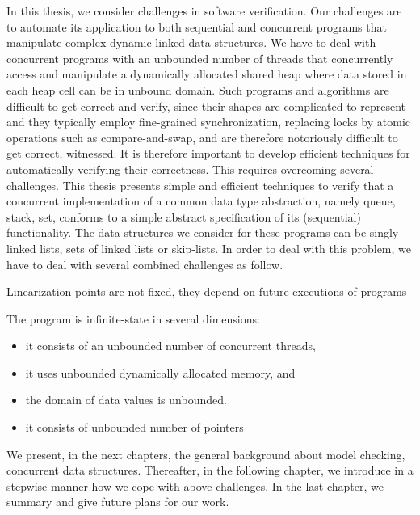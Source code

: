 In this thesis, we consider challenges in software verification. Our challenges are to automate its application to both sequential and concurrent programs that manipulate complex dynamic linked data structures. We have to deal with concurrent programs with an unbounded number of threads that concurrently access and manipulate a dynamically allocated shared heap where data stored in each heap cell can be in unbound domain. Such programs and algorithms are difficult to get correct and verify, since their shapes are complicated to represent and they typically employ fine-grained synchronization, replacing locks by atomic operations such as compare-and-swap, and are therefore notoriously difficult to get correct, witnessed. It is therefore important to develop efficient techniques for automatically verifying their correctness. This requires overcoming several challenges. This thesis presents simple and efficient techniques to verify that a concurrent implementation of a common data type abstraction, namely queue, stack, set, conforms to a simple abstract specification of its (sequential) functionality. The data structures we consider for these programs can be singly-linked lists, sets of linked lists or skip-lists. In order to deal with this problem, we have to deal with several combined challenges as follow.
\newpage
\begin{challenges}
\item Linearization points are not fixed, they depend on future executions of programs
\item The program is infinite-state in several dimensions:
\begin{itemize}
\item it consists of an unbounded number of concurrent threads,
\item it uses unbounded dynamically allocated memory, and
\item the domain of data values is unbounded.
\item it consists of unbounded number of pointers
\end{itemize}

\end{challenges}
We present, in the next chapters, the general background about model checking, concurrent data structures. Thereafter, in the following chapter, we introduce in a stepwise manner how
we cope with  above challenges. In the last chapter, we summary and give future plans for our work.